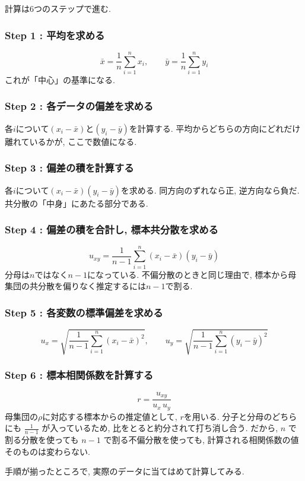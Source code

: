 計算は6つのステップで進む.

\subsubsection*{Step 1 : 平均を求める}
\[
\bar{x} = \frac{1}{n} \sum_{i=1}^{n} x_i, \qquad \bar{y} = \frac{1}{n} \sum_{i=1}^{n} y_i
\]
これが「中心」の基準になる.

\subsubsection*{Step 2 : 各データの偏差を求める}
各$i$について$(x_i - \bar{x})$と$(y_i - \bar{y})$を計算する.
平均からどちらの方向にどれだけ離れているかが, ここで数値になる.

\subsubsection*{Step 3 : 偏差の積を計算する}
各$i$について$(x_i - \bar{x})(y_i - \bar{y})$を求める.
同方向のずれなら正, 逆方向なら負だ.
共分散の「中身」にあたる部分である.

\subsubsection*{Step 4 : 偏差の積を合計し, 標本共分散を求める}
\[
u_{xy} = \frac{1}{n-1} \sum_{i=1}^{n} (x_i - \bar{x})(y_i - \bar{y})
\]
分母は$n$ではなく$n-1$になっている.
不偏分散のときと同じ理由で, 標本から母集団の共分散を偏りなく推定するには$n-1$で割る.

\subsubsection*{Step 5 : 各変数の標準偏差を求める}
\[
u_x = \sqrt{\frac{1}{n-1} \sum_{i=1}^{n} (x_i - \bar{x})^2}, \qquad u_y = \sqrt{\frac{1}{n-1} \sum_{i=1}^{n} (y_i - \bar{y})^2}
\]

\subsubsection*{Step 6 : 標本相関係数を計算する}
\[
r = \frac{u_{xy}}{u_x \, u_y}
\]
母集団の$\rho$に対応する標本からの推定値として, $r$を用いる.
分子と分母のどちらにも $\frac{1}{n-1}$ が入っているため, 比をとると約分されて打ち消し合う.
だから, $n$ で割る分散を使っても $n-1$ で割る不偏分散を使っても, 計算される相関係数の値そのものは変わらない.

手順が揃ったところで, 実際のデータに当てはめて計算してみる.


